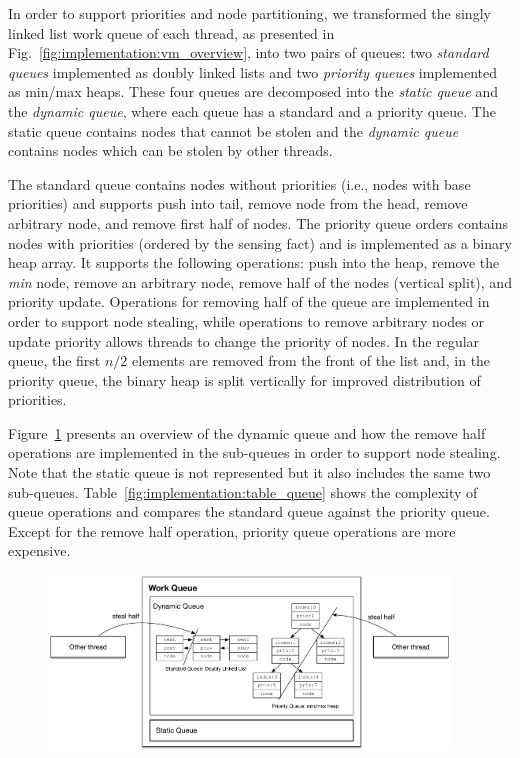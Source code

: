 In order to support priorities and node partitioning, we transformed the singly linked list work queue
of each thread, as presented in Fig.~\ref{fig:implementation:vm_overview}, into
two pairs of queues: two \emph{standard queues} implemented as doubly linked lists
and two \emph{priority queues} implemented as min/max heaps.
These four queues are decomposed into the \emph{static queue} and
the \emph{dynamic queue}, where each queue has a standard and a priority queue.
The static queue contains nodes that cannot be stolen and the \emph{dynamic queue}
contains nodes which can be stolen by other threads.

The standard queue contains nodes without priorities (i.e., nodes with base priorities) and supports push into
tail, remove node from the head, remove arbitrary node, and remove first half of
nodes.  The priority queue orders contains nodes with priorities (ordered by the  sensing fact) and is implemented as
a binary heap array.  It supports the following operations: push into the heap,
remove the \emph{min} node, remove an arbitrary node, remove half of the nodes
(vertical split), and priority update.  Operations for removing half of the
queue are implemented in order to support node stealing, while operations to
remove arbitrary nodes or update priority allows threads to change the priority
of nodes. In the regular queue, the first $n/2$ elements
are removed from the front of the list and, in the priority queue, the binary
heap is split vertically for improved distribution of priorities.

Figure~\ref{fig:implementation:work_queue} presents an overview of the dynamic queue
and how the remove half operations are implemented in the sub-queues in
order to support node stealing. Note that the static queue is not represented but it also includes the same two sub-queues.
Table~\ref{fig:implementation:table_queue} shows the complexity of
queue operations and compares the standard queue against the priority queue.
Except for the remove half operation, priority queue operations are more
expensive.

\begin{figure}[t]
	\centering
	\includegraphics[width=0.95\textwidth]{figures/implementation/work_queue.pdf}
	\label{fig:implementation:work_queue}
\end{figure}


